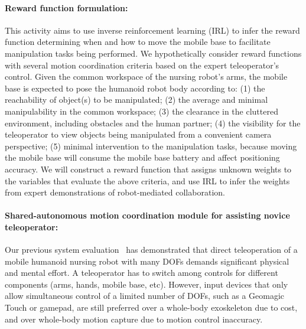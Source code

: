 \documentclass[letterpaper, 11 pt, onecolumn]{article}
\begin{document}
\paragraph*{Reward function formulation:} This activity aims to use inverse reinforcement learning (IRL) to infer the reward function determining when and how to move the mobile base to facilitate manipulation tasks being performed. We hypothetically consider reward functions with several motion coordination criteria based on the expert teleoperator's control. Given the common workspace of the nursing robot's arms, the mobile base is expected to pose the humanoid robot body according to: (1) the reachability of object(s) to be manipulated; (2) the average and minimal manipulability in the common workspace; (3) the clearance in the cluttered environment, including obstacles and the human partner; (4) the visibility for the teleoperator to view objects being manipulated from a convenient camera perspective; (5) minimal intervention to the manipulation tasks, because moving the mobile base will consume the mobile base battery and affect positioning accuracy. We will construct a reward function that assigns unknown weights to the variables that evaluate the above criteria, and use IRL to infer the weights from expert demonstrations of robot-mediated collaboration.

\paragraph*{Shared-autonomous motion coordination module for assisting novice teleoperator:} Our previous system evaluation~\cite{Hauser_Li_TRINA:17} has demonstrated that direct teleoperation of a mobile humanoid nursing robot with many DOFs demands significant physical and mental effort. A teleoperator has to switch among controls for different components (arms, hands, mobile base, etc). However, input devices that only allow simultaneous control of a limited number of DOFs, such as a Geomagic Touch or gamepad, are still preferred over a whole-body exoskeleton due to cost, and over whole-body motion capture due to motion control inaccuracy.

\end{document}

